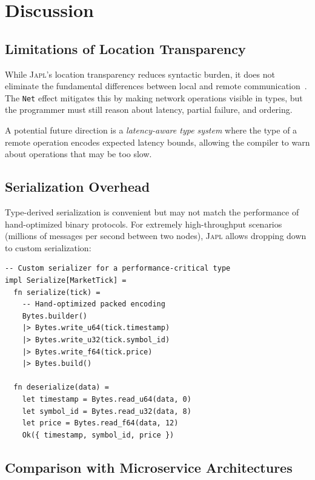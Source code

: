 \documentclass[11pt,a4paper]{article}
\newcommand{\japl}{\textsc{Japl}}
\begin{document}
\section{Discussion}
\label{sec:discussion}

\subsection{Limitations of Location Transparency}

While \japl{}'s location transparency reduces syntactic burden, it does
not eliminate the fundamental differences between local and remote
communication~\citep{waldo1996note}. The \texttt{Net} effect mitigates
this by making network operations visible in types, but the programmer
must still reason about latency, partial failure, and ordering.

A potential future direction is a \emph{latency-aware type system} where
the type of a remote operation encodes expected latency bounds, allowing
the compiler to warn about operations that may be too slow.

\subsection{Serialization Overhead}

Type-derived serialization is convenient but may not match the performance
of hand-optimized binary protocols. For extremely high-throughput scenarios
(millions of messages per second between two nodes), \japl{} allows
dropping down to custom serialization:

\begin{lstlisting}
-- Custom serializer for a performance-critical type
impl Serialize[MarketTick] =
  fn serialize(tick) =
    -- Hand-optimized packed encoding
    Bytes.builder()
    |> Bytes.write_u64(tick.timestamp)
    |> Bytes.write_u32(tick.symbol_id)
    |> Bytes.write_f64(tick.price)
    |> Bytes.build()

  fn deserialize(data) =
    let timestamp = Bytes.read_u64(data, 0)
    let symbol_id = Bytes.read_u32(data, 8)
    let price = Bytes.read_f64(data, 12)
    Ok({ timestamp, symbol_id, price })
\end{lstlisting}

\subsection{Comparison with Microservice Architectures}
\end{document}
